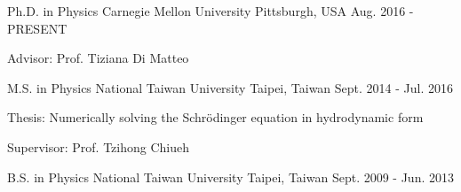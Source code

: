 


\begin{cventries}


\cventry
{Ph.D. in Physics} %
{Carnegie Mellon University} %
{Pittsburgh, USA} %
{Aug. 2016 - PRESENT} %
{ %
\begin{cvitems}
\item {Advisor: Prof. Tiziana Di Matteo}
\end{cvitems}
}

\cventry
{M.S. in Physics} %
{National Taiwan University} %
{Taipei, Taiwan} %
{Sept. 2014 - Jul. 2016} %
{ %
\begin{cvitems}
\item {Thesis: Numerically solving the Schrödinger equation in hydrodynamic form}
\item {Supervisor: Prof. Tzihong Chiueh }
\end{cvitems}
}

\cventry
{B.S. in Physics} %
{National Taiwan University} %
{Taipei, Taiwan} %
{Sept. 2009 - Jun. 2013} %
{%
}



\end{cventries}